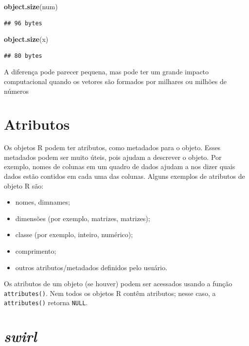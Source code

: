 \documentclass[]{book}
\newenvironment{Shaded}{\begin{snugshade}}{\end{snugshade}}
\newcommand{\KeywordTok}[1]{\textcolor[rgb]{0.13,0.29,0.53}{\textbf{#1}}}
\newcommand{\NormalTok}[1]{#1}
\begin{document}
\begin{Shaded}
\begin{Highlighting}[]
\KeywordTok{object.size}\NormalTok{(num)}
\end{Highlighting}
\end{Shaded}

\begin{verbatim}
## 96 bytes
\end{verbatim}

\begin{Shaded}
\begin{Highlighting}[]
\KeywordTok{object.size}\NormalTok{(x)}
\end{Highlighting}
\end{Shaded}

\begin{verbatim}
## 80 bytes
\end{verbatim}

A diferença pode parecer pequena, mas pode ter um grande impacto computacional quando os vetores são formados por milhares ou milhões de números

\hypertarget{atributos}{%
\section{Atributos}\label{atributos}}

Os objetos R podem ter atributos, como metadados para o objeto. Esses metadados podem ser muito úteis, pois ajudam a descrever o objeto. Por exemplo, nomes de colunas em um quadro de dados ajudam a nos dizer quais dados estão contidos em cada uma das colunas. Alguns exemplos de atributos de objeto R são:

\begin{itemize}
\item
  nomes, dimnames;
\item
  dimensões (por exemplo, matrizes, matrizes);
\item
  classe (por exemplo, inteiro, numérico);
\item
  comprimento;
\item
  outros atributos/metadados definidos pelo usuário.
\end{itemize}

Os atributos de um objeto (se houver) podem ser acessados usando a função \texttt{attributes()}. Nem todos os objetos R contêm atributos; nesse caso, a \texttt{attributes()} retorna \texttt{NULL}.

\hypertarget{swirl}{%
\section{\texorpdfstring{\emph{swirl}}{swirl}}\label{swirl}}
\end{document}

